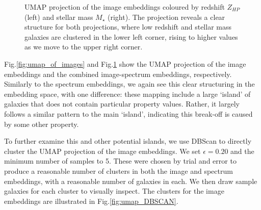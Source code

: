 \documentclass[a4paper,12pt]{article}
\begin{document}
\begin{figure}[H]
    \centering
    \caption{UMAP projection of the image embeddings coloured by redshift $Z_{HP}$ (left) and stellar mass $M_{\star}$ (right). The projection reveals a clear structure for both projections, where low redshift and stellar mass galaxies are clustered in the lower left corner, rising to higher values as we move to the upper right corner.}
    \label{fig:umap_of_both}
\end{figure}

Fig.\ref{fig:umap_of_images} and Fig.\ref{fig:umap_of_both} show the UMAP projection of the image embeddings and the combined image-spectrum embeddings, respectively. Similarly to the spectrum embeddings, we again see this clear structuring in the embedding space, with one difference: these mapping include a large `island' of galaxies that does not contain particular property values. Rather, it largely follows a similar pattern to the main `island', indicating this break-off is caused by some other property.




To further examine this and other potential islands, we use DBScan to directly cluster the UMAP projection of the image embeddings. We set $\epsilon = 0.20$ and the minimum number of samples to 5. These were chosen by trial and error to produce a reasonable number of clusters in both the image and spectrum embeddings, with a reasonable number of galaxies in each. We then draw sample galaxies for each cluster to visually inspect. The clusters for the image embeddings are illustrated in Fig.\ref{fig:umap_DBSCAN}.
\end{document}
